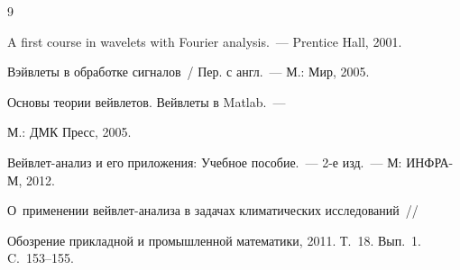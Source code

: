 {\small\frenchspacing

{%


\begin{thebibliography}{9}





    A first course in wavelets with Fourier analysis.~--- Prentice Hall, 2001.

    


     Вэйвлеты в обработке сигналов~/ Пер. с англ.~--- М.: Мир, 2005.




     Основы теории вейвлетов. Вейвлеты в Matlab.~--- 

    М.: ДМК Пресс, 2005.





Вейвлет-анализ и его приложения: Учебное пособие.~--- 2-е изд.~--- М: ИНФРА-М, 2012.



        

    \label{end\stat} 

    



    О~применении вейвлет-ана\-ли\-за в задачах климатических исследований~/\!\!/ 

    Обозрение прикладной и промышленной математики, 2011. Т.~18. Вып.~1. C.~153--155.

 \end{thebibliography}

}

}


















